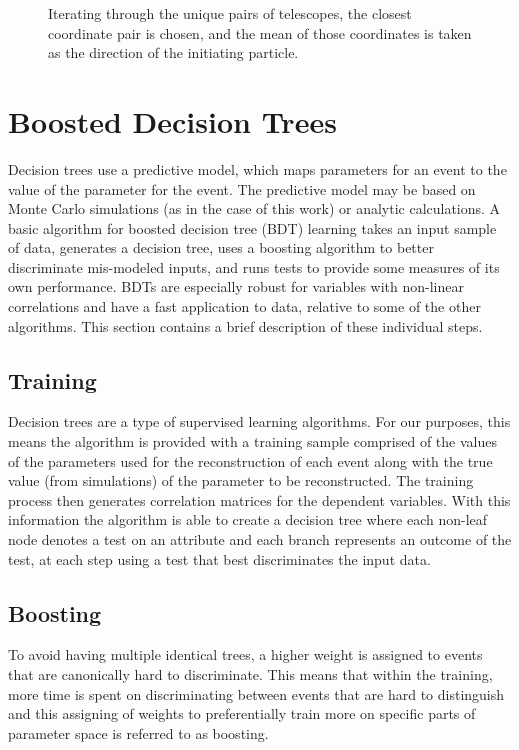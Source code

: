 \documentclass[main.tex]{subfiles}
\begin{document}
\begin{figure}[htbp]
{}
  \caption[Combining multiple telescopes in \disp reconstruction.]{Iterating through the unique pairs of telescopes, the closest coordinate pair is chosen, and the mean of those coordinates is taken as the direction of the initiating particle.}
  \label{fig:head_tail}
\end{figure}


\section{Boosted Decision Trees}
Decision trees use a predictive model, which maps parameters for an event to the value of the \disp parameter for the event. The predictive model may be based on Monte Carlo simulations (as in the case of this work) or analytic calculations. A basic algorithm for boosted decision tree (BDT) learning takes an input sample of data, generates a decision tree, uses a boosting algorithm to better discriminate mis-modeled inputs, and runs tests to provide some measures of its own performance. BDTs are especially robust for variables with non-linear correlations and have a fast application to data, relative to some of the other algorithms. This section contains a brief description of these individual steps.

\subsection{Training}
Decision trees are a type of supervised learning algorithms. For our purposes, this means the algorithm is provided with a training sample comprised of the values of the parameters used for the reconstruction of each event along with the true value (from simulations) of the parameter to be reconstructed. The training process then generates correlation matrices for the dependent variables. With this information the algorithm is able to create a decision tree where each non-leaf node denotes a test on an attribute and each branch represents an outcome of the test, at each step using a test that best discriminates the input data.

\subsection{Boosting}
To avoid having multiple identical trees, a higher weight is assigned to events that are canonically hard to discriminate. This means that within the training, more time is spent on discriminating between events that are hard to distinguish and this assigning of weights to preferentially train more on specific parts of parameter space is referred to as boosting.
\end{document}
